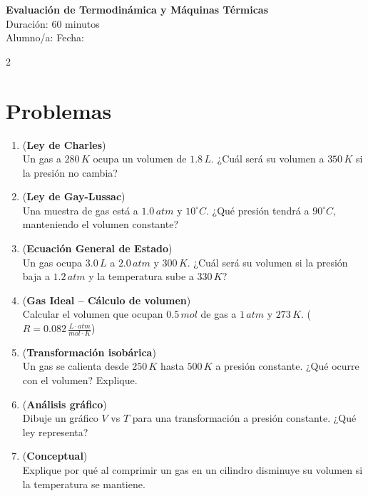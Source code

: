 \documentclass[a4paper,12pt]{article}
\begin{document}
\begin{center}
    \Large \textbf{Evaluación de Termodinámica y Máquinas Térmicas} \\
    \normalsize Duración: 60 minutos \\
    Alumno/a: \underline{\hspace{6cm}} \hspace{0.5cm} Fecha: \underline{\hspace{2cm}}
\end{center}

\vspace{0.3cm}

\begin{multicols}{2}

\section*{Problemas}

\begin{enumerate}
\item (\textbf{Ley de Charles})\\
Un gas a $280\,K$ ocupa un volumen de $1.8\,L$. ¿Cuál será su volumen a $350\,K$ si la presión no cambia?

\item (\textbf{Ley de Gay-Lussac})\\
Una muestra de gas está a $1.0\,atm$ y $10^\circ C$. ¿Qué presión tendrá a $90^\circ C$, manteniendo el volumen constante?

\item (\textbf{Ecuación General de Estado})\\
Un gas ocupa $3.0\,L$ a $2.0\,atm$ y $300\,K$. ¿Cuál será su volumen si la presión baja a $1.2\,atm$ y la temperatura sube a $330\,K$?

\item (\textbf{Gas Ideal – Cálculo de volumen})\\
Calcular el volumen que ocupan $0.5\,mol$ de gas a $1\,atm$ y $273\,K$. ($R = 0.082\,\frac{L \cdot atm}{mol \cdot K}$)

\item (\textbf{Transformación isobárica})\\
Un gas se calienta desde $250\,K$ hasta $500\,K$ a presión constante. ¿Qué ocurre con el volumen? Explique.

\item (\textbf{Análisis gráfico})\\
Dibuje un gráfico $V$ vs $T$ para una transformación a presión constante. ¿Qué ley representa?

\item (\textbf{Conceptual})\\
Explique por qué al comprimir un gas en un cilindro disminuye su volumen si la temperatura se mantiene.

\end{enumerate}

\vspace{0.2cm}

\end{multicols}
\end{document}
